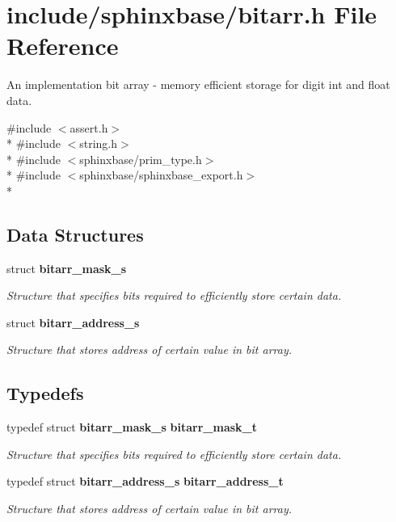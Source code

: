\section{include/sphinxbase/bitarr.h File Reference}
\label{bitarr_8h}


An implementation bit array -\/ memory efficient storage for digit int and float data.  


{\ttfamily \#include $<$assert.\-h$>$}\\*
{\ttfamily \#include $<$string.\-h$>$}\\*
{\ttfamily \#include $<$sphinxbase/prim\-\_\-type.\-h$>$}\\*
{\ttfamily \#include $<$sphinxbase/sphinxbase\-\_\-export.\-h$>$}\\*
\subsection*{Data Structures}
\begin{DoxyCompactItemize}
\item 
struct {\bf bitarr\-\_\-mask\-\_\-s}
\begin{DoxyCompactList}\small\item\em Structure that specifies bits required to efficiently store certain data. \end{DoxyCompactList}\item 
struct {\bf bitarr\-\_\-address\-\_\-s}
\begin{DoxyCompactList}\small\item\em Structure that stores address of certain value in bit array. \end{DoxyCompactList}\end{DoxyCompactItemize}
\subsection*{Typedefs}
\begin{DoxyCompactItemize}
\item 
typedef struct {\bf bitarr\-\_\-mask\-\_\-s} {\bf bitarr\-\_\-mask\-\_\-t}\label{bitarr_8h_abcb7d3674c4b4bbed7af00ddfc07a11f}

\begin{DoxyCompactList}\small\item\em Structure that specifies bits required to efficiently store certain data. \end{DoxyCompactList}\item 
typedef struct {\bf bitarr\-\_\-address\-\_\-s} {\bf bitarr\-\_\-address\-\_\-t}\label{bitarr_8h_a0ec20752a791dac325045da770b3510d}

\begin{DoxyCompactList}\small\item\em Structure that stores address of certain value in bit array. \end{DoxyCompactList}\end{DoxyCompactItemize}
